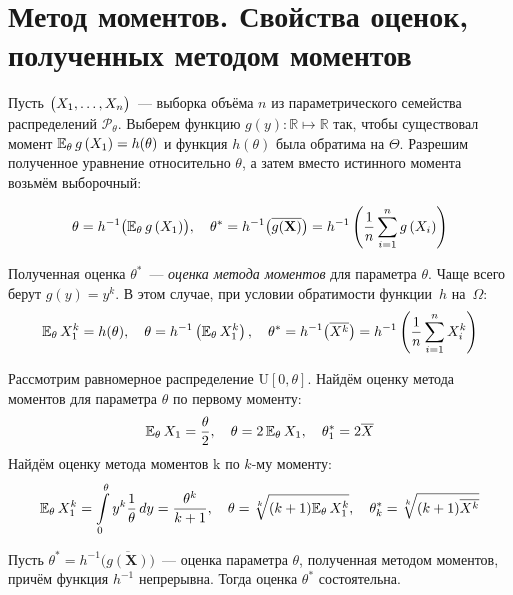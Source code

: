 \section{Метод моментов. Свойства оценок, полученных методом моментов}

Пусть $\bigl( X_1, \ldots, X_n \bigr)$~--- выборка объёма $n$ из параметрического семейства распределений $\mathcal{P}_\theta$. 
Выберем функцию $g(y)\colon \mathbb{R} \mapsto \mathbb{R}$ так, чтобы существовал момент $\mathbb{E}_{\theta}\, g\left(X_{1}\right)=h(\theta)$ и функция $h(\theta)$ была обратима на $\Theta$. 
Разрешим полученное уравнение относительно $\theta$, а затем вместо истинного момента возьмём выборочный:

\begin{equation*}
    \theta = h^{-1}\bigl(\mathbb{E}_{\theta}\, g\left(X_{1}\right)\bigr), \quad 
    \theta^{*}=h^{-1}\bigl(\overline{g(\mathbf{X})}\bigr) = 
    h^{-1}\left(\frac{1}{n} \sum\limits_{i=1}^{n} g\left(X_{i}\right)\right)
\end{equation*}

Полученная оценка $\theta^{*}$~--- \textit{оценка метода моментов} для параметра $\theta$. 
Чаще всего берут $g(y)=y^{k}$. 
В этом случае, при условии обратимости функции~$h$ на~$\Omega$:
\begin{equation*}
    \mathbb{E}_{\theta}\, X_{1}^{k}=h(\theta), \quad 
    \theta = h^{-1}\left(\mathbb{E}_{\theta}\, X_{1}^{k}\right), \quad 
    \theta^{*} = h^{-1}\bigl( \overline{X^{k}} \bigr) = 
    h^{-1}\left(\frac{1}{n} \sum\limits_{i=1}^{n} X_{i}^{k}\right)
\end{equation*}

\begin{exmp}
    Рассмотрим равномерное распределение $\mathrm{U}[0, \theta]$. 
    Найдём оценку метода моментов для параметра $\theta$ по первому моменту:
    \begin{equation*}
        \mathbb{E}_{\theta}\, X_{1}=\frac{\theta}{2}, \quad 
        \theta = 2\,\mathbb{E}_{\theta}\, X_{1}, \quad 
        \theta_{1}^{*}=2 \overline{X}
    \end{equation*}
    Найдём оценку метода моментов k по $k$-му моменту:
    \begin{equation*}
        \mathbb{E}_{\theta}\, X_{1}^{k} =
        \int\limits_{0}^{\theta} y^{k} \frac{1}{\theta} \, dy = 
        \frac{\theta^{k}}{k+1}, \quad 
        \theta=\sqrt[k]{(k+1) \mathbb{E}_{\theta}\, X_{1}^{k}}, \quad 
        \theta_{k}^{*}=\sqrt[k]{(k+1) \overline{X^{k}}}
    \end{equation*}
\end{exmp}

\begin{thm*}
    Пусть $\theta^{*}=h^{-1}\bigl(\overline{g(\mathbf{X})}\bigr)$~--- оценка параметра $\theta$, полученная методом моментов, причём функция $h^{-1}$ непрерывна. 
    Тогда оценка $\theta^{*}$ состоятельна.
\end{thm*}

